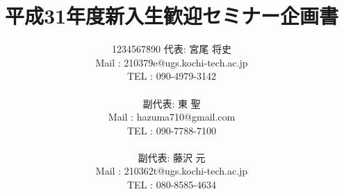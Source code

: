 



\headsep -10mm
\oddsidemargin -0mm
\textwidth 160mm
\textheight 240mm

\setcounter{secnumdepth}{6}  %

\title{平成31年度新入生歓迎セミナー企画書}
\author{
	\begin{tabbing}
		1234567\=890\kill
		代表\>:
		宮尾 将史\\
		{\large Mail}\>
		{\large : 210379e@ugs.kochi-tech.ac.jp}\\
		{\large TEL}\>
		{\large : 090-4979-3142}\\\\
		副代表\>:
		東 聖\\
		{\large Mail}\>
		{\large : hazuma710@gmail.com}\\
		{\large TEL}\>
		{\large : 090-7788-7100}\\\\
		副代表\>:
		藤沢 元\\
		{\large Mail}\>
		{\large : 210362t@ugs.kochi-tech.ac.jp}\\
		{\large TEL}\>
		{\large : 080-8585-4634}
	\end{tabbing}
}

